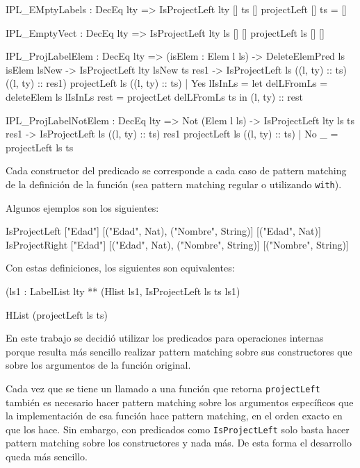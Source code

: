 \begin{code}
IPL_EMptyLabels : DecEq lty => IsProjectLeft {lty} [] ts []
projectLeft [] ts = []

IPL_EmptyVect : DecEq lty => IsProjectLeft {lty} ls [] []
projectLeft ls [] []

IPL_ProjLabelElem : DecEq lty => (isElem : Elem l ls) ->
  DeleteElemPred ls isElem lsNew ->
  IsProjectLeft {lty} lsNew ts res1 ->
  IsProjectLeft ls ((l, ty) :: ts) ((l, ty) :: res1)
projectLeft ls ((l, ty) :: ts) | Yes lIsInLs =
  let delLFromLs = deleteElem ls lIsInLs
    rest = projectLet delLFromLs ts
  in (l, ty) :: rest

IPL_ProjLabelNotElem : DecEq lty => Not (Elem l ls) ->
  IsProjectLeft {lty} ls ts res1 ->
  IsProjectLeft ls ((l, ty) :: ts) res1
projectLeft ls ((l, ty) :: ts) | No _ = projectLeft ls ts
\end{code}

Cada constructor del predicado se corresponde a cada caso de pattern matching de la definición de la función (sea pattern matching regular o utilizando \texttt{with}).

Algunos ejemplos son los siguientes:

\begin{code}
IsProjectLeft ["Edad"] [("Edad", Nat), ("Nombre", String)]
  [("Edad", Nat)]
IsProjectRight ["Edad"] [("Edad", Nat), ("Nombre", String)]
  [("Nombre", String)]
\end{code}

Con estas definiciones, los siguientes son equivalentes:

\begin{code}
(ls1 : LabelList lty ** (Hlist ls1, IsProjectLeft ls ts ls1)

HList (projectLeft ls ts)
\end{code}

En este trabajo se decidió utilizar los predicados para operaciones internas porque resulta más sencillo realizar pattern matching sobre sus constructores que sobre los argumentos de la función original.

Cada vez que se tiene un llamado a una función que retorna \texttt{projectLeft} también es necesario hacer pattern matching sobre los argumentos específicos que la implementación de esa función hace pattern matching, en el orden exacto en que los hace. Sin embargo, con predicados como \texttt{IsProjectLeft} solo basta hacer pattern matching sobre los constructores y nada más. De esta forma el desarrollo queda más sencillo.

